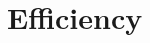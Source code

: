 \documentclass[10pt, journal, compsoc, authoryear]{article}
\numberwithin{equation}{subsection}
\theoremstyle{definition}
\begin{document}
\begin{comment}
Continue a line of work by \citet{huang1995software} and 
\citet{dohi2000statistical}, this paper proposes an alternative Markov 
model for software rejuvenate.  Specifically, we expend each state, $S$, in 
traditional models to a group of states, $S(\tau)$, where $\tau$ represents 
the elapsed time that the system has been entered into state $S$.  
The above model is equivalent to a semi-Markov process.  It, however, brings two 
benefits and one limitation.  The first 
benefit is that state transition probabilities can be precisely described.  
Like in general reliability studies, the failure rate in the new model 
can be precisely described by an arbitrary probability density function or 
probability mass function.  In contrast, traditional models either use the 
average Mean Time to Failure (MTTF) for cost analysis or assume that the time 
spent in each state has an exponential distribution.  The second 
benefit is that transition probabilities of the new Markov process has take 
time into account.  The result model is either a simple Markov chain if time is 
a discrete value,  or a general Markov process if time is a continuous value.  
Comparing to traditional models that are semi-Markov processes or Continuous 
Time Markov Chains (CTMT), the Markov Chain used in proposed model is often 
easier to understand and analysis.  The downside of expending the state space 
is the decreased performance of simulation processes.  Fortunately, approximate 
estimations can be given to balance the trade-off between accuracy and 
efficiency.  Most importantly, we show that the classical model given by 
\citep{huang1995software} is the least accurate approximation.  Moreover, 
inspired by economical theories, a notion of {\it utility} function
is proposes paper to unify the cost analysis and the availability 
analysis, which are usually treated separately in previous studies.



\end{abstract}
\end{comment} 













\section{Efficiency}
\end{document}
